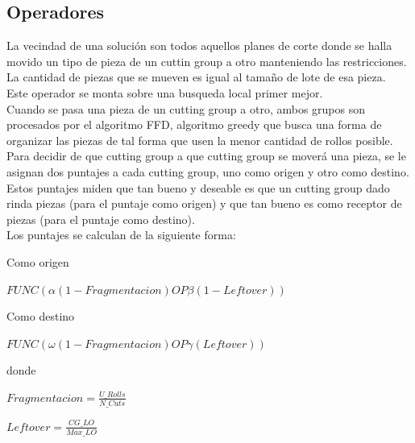 \documentclass[letter,10pt]{article}
\begin{document}
\subsection{Operadores}
La vecindad de una soluci\'on son todos aquellos planes de corte donde se halla movido un tipo de pieza de un cuttin group a otro manteniendo
las restricciones. La cantidad de piezas que se mueven es igual al tama\~no de lote de esa pieza.\\
\indent Este operador se monta sobre una busqueda local primer mejor.\\
\indent Cuando se pasa una pieza de un cutting group a otro, ambos grupos son procesados por el algoritmo FFD, algoritmo greedy que busca una
forma de organizar las piezas de tal forma que usen la menor cantidad de rollos posible.\\
\indent Para decidir de que cutting group a que cutting group se mover\'a una pieza, se le asignan dos puntajes a cada cutting group, uno como
origen y otro como destino. Estos puntajes miden que tan bueno y deseable es que un cutting group dado rinda piezas (para el puntaje como origen)
y que tan bueno es como receptor de piezas (para el puntaje como destino).\\
\indent Los puntajes se calculan de la siguiente forma:

\begin{center}
Como origen

$FUNC(\alpha(1-Fragmentacion) OP \beta(1-Leftover))$
\end{center}

\begin{center}
Como destino

$FUNC(\omega(1-Fragmentacion) OP \gamma(Leftover))$
\end{center}

donde

\begin{center}
$Fragmentacion = \frac{U\_Rolls}{N\_Cuts}$
\end{center}

\begin{center}
$Leftover = \frac{CG\_LO}{Max\_LO}$
\end{center}
\end{document}
